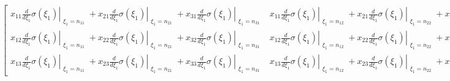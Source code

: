 \documentclass[11pt]{article}
\makeatletter
\newcommand{\boxspacing}{\kern\kvtcb@left@rule\kern\kvtcb@boxsep}
\newcommand{\prompt}[4]{
        \ttfamily\llap{{\color{#2}[#3]:\hspace{3pt}#4}}\vspace{-\baselineskip}
    }
\makeatother
\begin{document}
    $\displaystyle \left[\begin{matrix}x_{11} \left. \frac{d}{d \xi_{1}} \sigma{\left(\xi_{1} \right)} \right|_{\substack{ \xi_{1}=n_{11} }} + x_{21} \left. \frac{d}{d \xi_{1}} \sigma{\left(\xi_{1} \right)} \right|_{\substack{ \xi_{1}=n_{21} }} + x_{31} \left. \frac{d}{d \xi_{1}} \sigma{\left(\xi_{1} \right)} \right|_{\substack{ \xi_{1}=n_{31} }} & x_{11} \left. \frac{d}{d \xi_{1}} \sigma{\left(\xi_{1} \right)} \right|_{\substack{ \xi_{1}=n_{12} }} + x_{21} \left. \frac{d}{d \xi_{1}} \sigma{\left(\xi_{1} \right)} \right|_{\substack{ \xi_{1}=n_{22} }} + x_{31} \left. \frac{d}{d \xi_{1}} \sigma{\left(\xi_{1} \right)} \right|_{\substack{ \xi_{1}=n_{32} }}\\x_{12} \left. \frac{d}{d \xi_{1}} \sigma{\left(\xi_{1} \right)} \right|_{\substack{ \xi_{1}=n_{11} }} + x_{22} \left. \frac{d}{d \xi_{1}} \sigma{\left(\xi_{1} \right)} \right|_{\substack{ \xi_{1}=n_{21} }} + x_{32} \left. \frac{d}{d \xi_{1}} \sigma{\left(\xi_{1} \right)} \right|_{\substack{ \xi_{1}=n_{31} }} & x_{12} \left. \frac{d}{d \xi_{1}} \sigma{\left(\xi_{1} \right)} \right|_{\substack{ \xi_{1}=n_{12} }} + x_{22} \left. \frac{d}{d \xi_{1}} \sigma{\left(\xi_{1} \right)} \right|_{\substack{ \xi_{1}=n_{22} }} + x_{32} \left. \frac{d}{d \xi_{1}} \sigma{\left(\xi_{1} \right)} \right|_{\substack{ \xi_{1}=n_{32} }}\\x_{13} \left. \frac{d}{d \xi_{1}} \sigma{\left(\xi_{1} \right)} \right|_{\substack{ \xi_{1}=n_{11} }} + x_{23} \left. \frac{d}{d \xi_{1}} \sigma{\left(\xi_{1} \right)} \right|_{\substack{ \xi_{1}=n_{21} }} + x_{33} \left. \frac{d}{d \xi_{1}} \sigma{\left(\xi_{1} \right)} \right|_{\substack{ \xi_{1}=n_{31} }} & x_{13} \left. \frac{d}{d \xi_{1}} \sigma{\left(\xi_{1} \right)} \right|_{\substack{ \xi_{1}=n_{12} }} + x_{23} \left. \frac{d}{d \xi_{1}} \sigma{\left(\xi_{1} \right)} \right|_{\substack{ \xi_{1}=n_{22} }} + x_{33} \left. \frac{d}{d \xi_{1}} \sigma{\left(\xi_{1} \right)} \right|_{\substack{ \xi_{1}=n_{32} }}\end{matrix}\right]$

    

    \begin{tcolorbox}[breakable, size=fbox, boxrule=1pt, pad at break*=1mm,colback=cellbackground, colframe=cellborder]
\prompt{In}{incolor}{116}{\boxspacing}
\begin{Verbatim}[commandchars=\\\{\}]

\end{Verbatim}
\end{tcolorbox}
\end{document}
